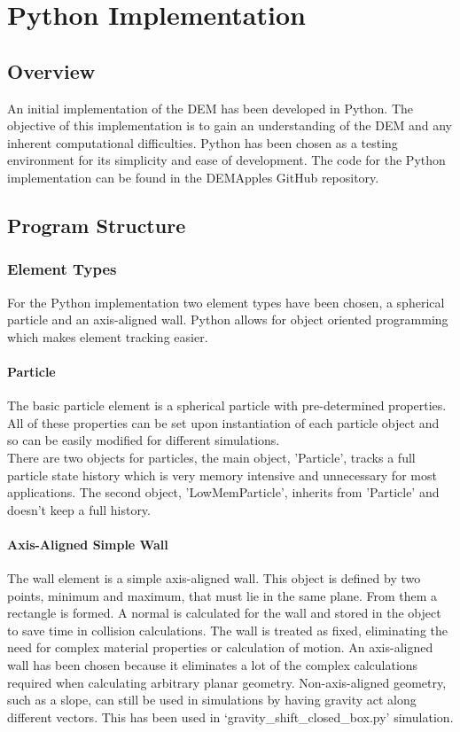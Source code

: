 \documentclass[a4paper,11pt,titlepage]{report}
\begin{document}
\chapter{Python Implementation}
\label{ch:Python Implementation}
\section{Overview}
An initial implementation of the DEM has been developed in Python. The objective of this implementation is to gain an understanding of the DEM and any inherent computational difficulties. Python has been chosen as a testing environment for its simplicity and ease of development. The code for the Python implementation can be found in the DEMApples GitHub repository\cite{DEMApples}.
\section{Program Structure}
\subsection{Element Types}
For the Python implementation two element types have been chosen, a spherical particle and an axis-aligned wall. Python allows for object oriented programming which makes element tracking easier.
\subsubsection{Particle}
The basic particle element is a spherical particle with pre-determined properties. All of these properties can be set upon instantiation of each particle object and so can be easily modified for different simulations.
\\There are two objects for particles, the main object, 'Particle', tracks a full particle state history which is very memory intensive and unnecessary for most applications. The second object, 'LowMemParticle', inherits from 'Particle' and doesn't keep a full history.
\subsubsection{Axis-Aligned Simple Wall}
The wall element is a simple axis-aligned wall. This object is defined by two points, minimum and maximum, that must lie in the same plane. From them a rectangle is formed. A normal is calculated for the wall and stored in the object to save time in collision calculations. The wall is treated as fixed, eliminating the need for complex material properties or calculation of motion. An axis-aligned wall has been chosen because it eliminates a lot of the complex calculations required when calculating arbitrary planar geometry. Non-axis-aligned geometry, such as a slope, can still be used in simulations by having gravity act along different vectors. This has been used in `gravity\_shift\_closed\_box.py' simulation\cite{DEMApples}.
\end{document}
